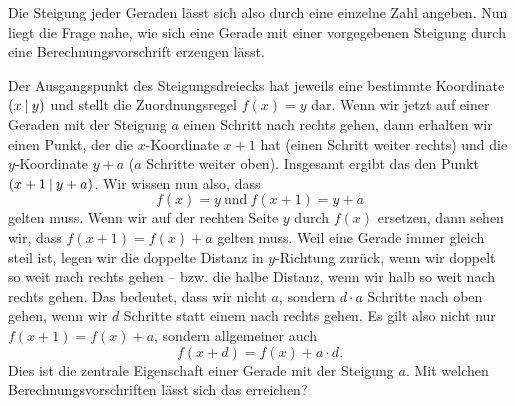\documentclass[../../main.tex]{subfiles}
\begin{document}
Die Steigung jeder Geraden lässt sich also durch eine einzelne Zahl angeben. Nun liegt die Frage nahe, wie sich eine Gerade mit einer vorgegebenen Steigung durch eine Berechnungsvorschrift erzeugen lässt. 


Der Ausgangspunkt des Steigungsdreiecks hat jeweils eine bestimmte Koordinate $\left(x \:\middle|\: y\right)$ und stellt die Zuordnungsregel $f(x)=y$ dar. Wenn wir jetzt auf einer Geraden mit der Steigung $a$ einen Schritt nach rechts gehen, dann erhalten wir einen Punkt, der die $x$-Koordinate $x+1$ hat (einen Schritt weiter rechts) und die $y$-Koordinate $y+a$ ($a$ Schritte weiter oben). Insgesamt ergibt das den Punkt $\left(x+1 \:\middle|\: y+a\right)$. Wir wissen nun also, dass
\[f(x)=y~\text{und}~f(x+1)=y+a\]
gelten muss. Wenn wir auf der rechten Seite $y$ durch $f(x)$ ersetzen, dann sehen wir, dass $f(x+1)=f(x)+a$ gelten muss. Weil eine Gerade immer gleich steil ist, legen wir die doppelte Distanz in $y$-Richtung zurück, wenn wir doppelt so weit nach rechts gehen -- bzw. die halbe Distanz, wenn wir halb so weit nach rechts gehen. Das bedeutet, dass wir nicht $a$, sondern $d\cdot a$ Schritte nach oben gehen, wenn wir $d$ Schritte statt einem nach rechts gehen. Es gilt also nicht nur $f(x+1)=f(x)+a$, sondern allgemeiner auch 
\[f(x+d)=f(x)+a\cdot d.\] Dies ist die zentrale Eigenschaft einer Gerade mit der Steigung $a$. Mit welchen Berechnungsvorschriften lässt sich das erreichen?
\end{document}
